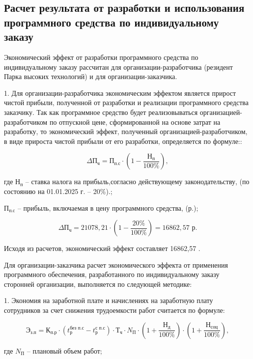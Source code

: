 \subsection{Расчет результата от разработки и использования программного средства по индивидуальному заказу}

Экономический эффект от разработки программного средства по индивидуальному заказу рассчитан для организации-разработчика (резидент Парка высоких технологий) и для организации-заказчика.

1. Для организации-разработчика экономическим эффектом является прирост чистой прибыли, полученной от разработки и реализации программного средства заказчику. Так как программное средство будет реализовываться организацией-разработчиком по отпускной цене, сформированной на основе затрат на разработку, то экономический эффект, полученный организацией-разработчиком, в виде прироста чистой прибыли от его разработки, определяется по формуле::

$$
	\text{$\Delta$П}_{\text{ч}} = \text{П}_{\text{п.с}} \cdot (1 - \frac{\text{Н}_{\text{п}} }{100\%}),
$$

где $\text{Н}_{\text{п}}$ -- ставка налога на прибыль,согласно действующему законодательству, (по состоянию на 01.01.2025 г. – 	20\%).;

$\text{П}_{\text{п.с}}$ -- прибыль, включаемая в цену программного средства, (р.);

$$
	\text{$\Delta$П}_{\text{ч}} = 21078,21 \cdot (1 - \frac{20\%}{100\%}) = 16862,57 \text{ р}.
$$

Исходя из расчетов, экономический эффект составляет 16862,57 .

Для организации-заказчика расчет экономического эффекта от применения программного обеспечения, разработанного по индивидуальному заказу сторонней организации, выполняется по следующей методике:

1. Экономия на заработной плате и начислениях на заработную плату сотрудников за счет снижения трудоемкости работ считается по формуле:


\begin{equation}
	\text{Э}_{\text{з.п}} = \text{К}_{\text{п.р}}\cdot (t^{\text{без п.с}}_{\text{р}}-t^{\text{с п.с}}_{\text{р}})\cdot \text{Т}_{\text{ч}}\cdot N_{\text{П}}\cdot  (1+\frac{\text{Н}_{\text{д}}}{100\%})\cdot (1+\frac{\text{Н}_{\text{соц}}}{100\%}),
\end{equation}

где $N_{\text{П}}$ -- плановый объем работ;

